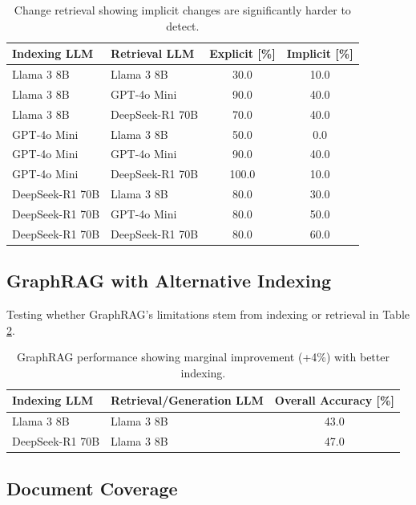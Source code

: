 \begin{table}[h]
\centering
\small
\caption{Change retrieval showing implicit changes are significantly harder to detect.}
\begin{tabular}{llcc}
\hline
Indexing LLM & Retrieval LLM & Explicit [\%] & Implicit [\%] \\ \hline
Llama 3 8B & Llama 3 8B & 30.0 & 10.0 \\
Llama 3 8B & GPT-4o Mini & 90.0 & 40.0 \\
Llama 3 8B & DeepSeek-R1 70B & 70.0 & 40.0 \\ \hline
GPT-4o Mini & Llama 3 8B & 50.0 & 0.0 \\
GPT-4o Mini & GPT-4o Mini & 90.0 & 40.0 \\
GPT-4o Mini & DeepSeek-R1 70B & 100.0 & 10.0 \\ \hline
DeepSeek-R1 70B & Llama 3 8B & 80.0 & 30.0 \\
DeepSeek-R1 70B & GPT-4o Mini & 80.0 & 50.0 \\
DeepSeek-R1 70B & DeepSeek-R1 70B & 80.0 & 60.0 \\ \hline
\end{tabular}
\label{tab:change_retrieval_breakdown}
\end{table}


\subsection{GraphRAG with Alternative Indexing}

Testing whether GraphRAG's limitations stem from indexing or retrieval in Table \ref{tab:graphrag_alternative_indexing}.

\begin{table}[hb]
\centering
\small
\caption{GraphRAG performance showing marginal improvement (+4\%) with better indexing.}
\begin{tabular}{llc}
\hline
Indexing LLM & Retrieval/Generation LLM & Overall Accuracy [\%] \\ \hline
Llama 3 8B & Llama 3 8B & 43.0 \\
DeepSeek-R1 70B & Llama 3 8B & 47.0 \\ \hline
\end{tabular}
\label{tab:graphrag_alternative_indexing}
\end{table}





\subsection{Document Coverage}

